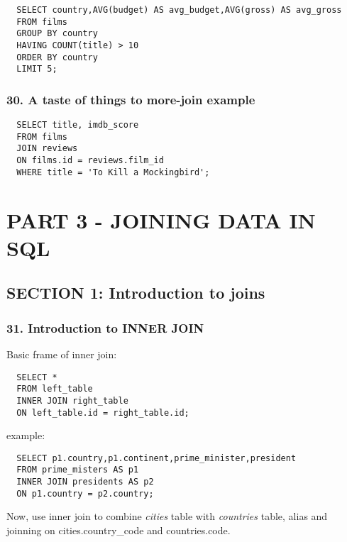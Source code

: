 \documentclass[
]{article}
\begin{document}
\begin{verbatim}
  SELECT country,AVG(budget) AS avg_budget,AVG(gross) AS avg_gross
  FROM films
  GROUP BY country
  HAVING COUNT(title) > 10
  ORDER BY country
  LIMIT 5;
\end{verbatim}

\hypertarget{a-taste-of-things-to-more-join-example}{%
\subsubsection{30. A taste of things to more-join
example}\label{a-taste-of-things-to-more-join-example}}

\begin{verbatim}
  SELECT title, imdb_score
  FROM films
  JOIN reviews
  ON films.id = reviews.film_id
  WHERE title = 'To Kill a Mockingbird';
\end{verbatim}

\hypertarget{part-3---joining-data-in-sql}{%
\section{PART 3 - JOINING DATA IN
SQL}\label{part-3---joining-data-in-sql}}

\hypertarget{section-1-introduction-to-joins}{%
\subsection{SECTION 1: Introduction to
joins}\label{section-1-introduction-to-joins}}

\hypertarget{introduction-to-inner-join}{%
\subsubsection{31. Introduction to INNER
JOIN}\label{introduction-to-inner-join}}

Basic frame of inner join:

\begin{verbatim}
  SELECT *
  FROM left_table
  INNER JOIN right_table
  ON left_table.id = right_table.id;
\end{verbatim}

example:

\begin{verbatim}
  SELECT p1.country,p1.continent,prime_minister,president
  FROM prime_misters AS p1
  INNER JOIN presidents AS p2
  ON p1.country = p2.country;
\end{verbatim}

Now, use inner join to combine \emph{cities} table with \emph{countries}
table, alias and joinning on cities.country\_code and countries.code.
\end{document}
